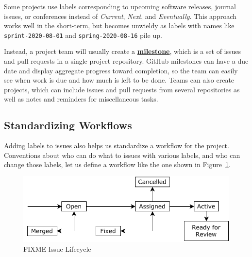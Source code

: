 \documentclass[
]{krantz}
\newcommand{\gref}[2]{\hyperlink{#2}{\textbf{#1}}}
\begin{document}
Some projects use labels corresponding to upcoming software releases, journal issues, or conferences
instead of \emph{Current}, \emph{Next}, and \emph{Eventually}.
This approach works well in the short-term,
but becomes unwieldy as labels with names like \texttt{sprint-2020-08-01} and \texttt{spring-2020-08-16} pile up.

Instead,
a project team will usually create a \gref{milestone}{milestone},
which is a set of issues and pull requests in a single project repository.
GitHub milestones can have a due date
and display aggregate progress toward completion,
so the team can easily see when work is due and how much is left to be done.
Teams can also create projects,
which can include issues and pull requests from several repositories
as well as notes and reminders for miscellaneous tasks.

\hypertarget{teams-workflow}{%
\subsection{Standardizing Workflows}\label{teams-workflow}}

Adding labels to issues also helps us standardize a workflow for the project.
Conventions about who can do what to issues with various labels,
and who can change those labels,
let us define a workflow like the one shown in Figure~\ref{fig:teams-lifecycle}.

\begin{figure}

{\centering \includegraphics[width=1\linewidth]{figures/teams/lifecycle} 

}

\caption{FIXME Issue Lifecycle}\label{fig:teams-lifecycle}
\end{figure}
\end{document}

